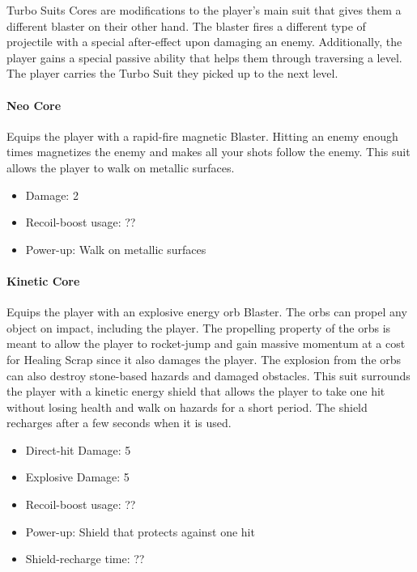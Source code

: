 \documentclass[12pt]{article}
\begin{document}
Turbo Suits Cores are modifications to the player's main suit that gives them a different blaster on their other hand. The blaster fires a different type of projectile with a special after-effect upon damaging an enemy. Additionally, the player gains a special passive ability that helps them through traversing a level. The player carries the Turbo Suit they picked up to the next level.

\paragraph{Neo Core}

Equips the player with a rapid-fire magnetic Blaster. Hitting an enemy enough times magnetizes the enemy and makes all your shots follow the enemy. This suit allows the player to walk on metallic surfaces.

\begin{itemize}
	\item Damage: 2
	\item Recoil-boost usage: ??
	\item Power-up: Walk on metallic surfaces
\end{itemize}


\paragraph{Kinetic Core}

Equips the player with an explosive energy orb Blaster. The orbs can propel any object on impact, including the player. The propelling property of the orbs is meant to allow the player to rocket-jump and gain massive momentum at a cost for Healing Scrap since it also damages the player. The explosion from the orbs can also destroy stone-based hazards and damaged obstacles. This suit surrounds the player with a kinetic energy shield that allows the player to take one hit without losing health and walk on hazards for a short period. The shield recharges after a few seconds when it is used.

\begin{itemize}
	\item Direct-hit Damage: 5
	\item Explosive Damage: 5
	\item Recoil-boost usage: ??
	\item Power-up: Shield that protects against one hit
	\item Shield-recharge time: ??
\end{itemize} 
\end{document}
